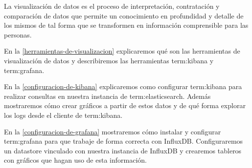 La visualización de datos es el proceso de interpretación, contratación y
comparación de datos que permite un conocimiento en profundidad y detalle de
los mismos de tal forma que se transformen en información comprensible para las
personas.

En la \autoref{herramientas-de-visualizacion} explicaremos qué son las herramientas de visualización de
datos y describiremos las herramientas \gls{term:kibana} y \gls{term:grafana}.

En la \autoref{configuracion-de-kibana} explicaremos como configurar \gls{term:kibana} para realizar
consultas en nuestra instancia de \gls{term:elasticsearch}. Además mostraremos
cómo crear gráficos a partir de estos datos y de qué forma explorar los logs
desde el cliente  de \gls{term:kibana}.

En la \autoref{configuracion-de-grafana} mostraremos cómo instalar y configurar \gls{term:grafana}
para que trabaje de forma correcta con InfluxDB. Configuraremos un datastore
vinculado con nuestra instancia de InfluxDB y crearemos tableros con gráficos
que hagan uso de esta información.
